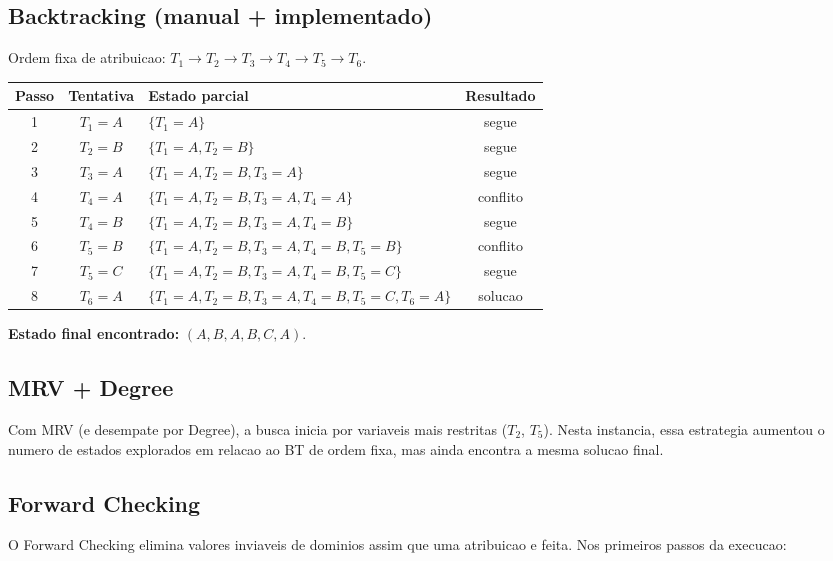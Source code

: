 \subsection{Backtracking (manual + implementado)}
Ordem fixa de atribuicao: $T_1 \rightarrow T_2 \rightarrow T_3 \rightarrow T_4 \rightarrow T_5 \rightarrow T_6$.

\begingroup
\small
\setlength{\tabcolsep}{5pt}
\renewcommand{\arraystretch}{1.08}
\begin{longtable}{c c >{\raggedright\arraybackslash}p{6.2cm} c}
\toprule
Passo & Tentativa & Estado parcial & Resultado \\
\midrule
1 & $T_1=A$ & \small $\{T_1=A\}$ & segue \\
2 & $T_2=B$ & \small $\{T_1=A,T_2=B\}$ & segue \\
3 & $T_3=A$ & \small $\{T_1=A,T_2=B,T_3=A\}$ & segue \\
4 & $T_4=A$ & \small $\{T_1=A,T_2=B,T_3=A,T_4=A\}$ & conflito \\
5 & $T_4=B$ & \small $\{T_1=A,T_2=B,T_3=A,T_4=B\}$ & segue \\
6 & $T_5=B$ & \small $\{T_1=A,T_2=B,T_3=A,T_4=B,T_5=B\}$ & conflito \\
7 & $T_5=C$ & \small $\{T_1=A,T_2=B,T_3=A,T_4=B,T_5=C\}$ & segue \\
8 & $T_6=A$ & \small $\{T_1=A,T_2=B,T_3=A,T_4=B,T_5=C,T_6=A\}$ & solucao \\
\bottomrule
\end{longtable}
\endgroup

\textbf{Estado final encontrado:} $(A,B,A,B,C,A)$.

\subsection{MRV + Degree}
Com MRV (e desempate por Degree), a busca inicia por variaveis mais restritas ($T_2$, $T_5$). Nesta instancia, essa estrategia aumentou o numero de estados explorados em relacao ao BT de ordem fixa, mas ainda encontra a mesma solucao final.

\subsection{Forward Checking}
O Forward Checking elimina valores inviaveis de dominios assim que uma atribuicao e feita. Nos primeiros passos da execucao:

